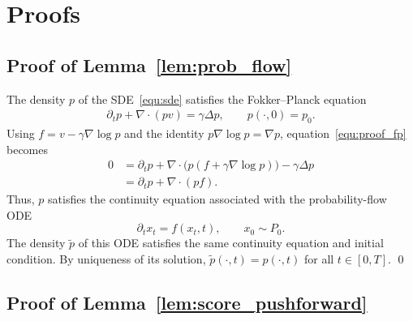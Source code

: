 \documentclass[preprint]{elsarticle}
\newcommand{\g}{\gamma}
\begin{document}
{\footnotesize


}

\appendix

\section{Proofs}\label{sec:appendix_proofs}
\subsection{Proof of Lemma~\ref{lem:prob_flow}}
\label{sec:proof_prob_flow}

The density $p$ of the SDE~\eqref{equ:sde} satisfies the Fokker--Planck equation
\begin{align}
    \partial_t p+\nabla\!\cdot(pv)=\g\Delta p,
    \qquad
    p(\cdot,0)=p_0.
    \label{equ:proof_fp}
\end{align}
Using $f=v-\g\nabla\log p$ and the identity $p\nabla\log p=\nabla p$, equation~\eqref{equ:proof_fp} becomes
\begin{align*}
    0
    &=\partial_t p+\nabla\!\cdot
      \bigl(p(f+\g\nabla\log p)\bigr)-\g\Delta p \\
    &=\partial_t p+\nabla\!\cdot(pf).
\end{align*}
Thus, $p$ satisfies the continuity equation associated with the probability-flow ODE
\[
    \partial_t x_t=f(x_t,t),
    \qquad
    x_0\sim P_0.
\]
The density $\tilde p$ of this ODE satisfies the same continuity equation and initial condition. By uniqueness of its solution, $\tilde p(\cdot,t)=p(\cdot,t)$ for all $t\in[0,T]$.
\qed


\subsection{Proof of Lemma~\ref{lem:score_pushforward}}
\label{sec:proof_score_pushforward}
\end{document}
